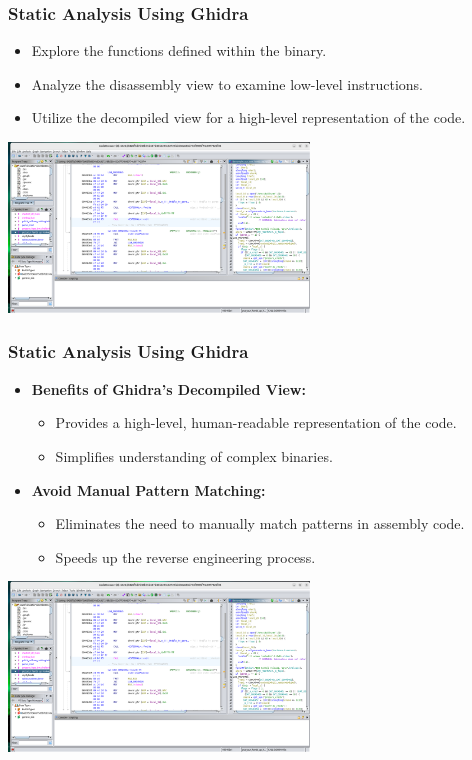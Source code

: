 \begin{frame}
\frametitle{Static Analysis Using Ghidra}

\begin{itemize}
    \item Explore the functions defined within the binary.
    \item Analyze the disassembly view to examine low-level instructions.
    \item Utilize the decompiled view for a high-level representation of the code.
\end{itemize}

\centering
\includegraphics[width=0.6\textwidth]{img/g2.png}
\end{frame}

\begin{frame}
\frametitle{Static Analysis Using Ghidra}

\begin{itemize}
    \item \textbf{Benefits of Ghidra's Decompiled View:}
    \begin{itemize}
        \item Provides a high-level, human-readable representation of the code.
        \item Simplifies understanding of complex binaries.
    \end{itemize}
    \item \textbf{Avoid Manual Pattern Matching:}
    \begin{itemize}
        \item Eliminates the need to manually match patterns in assembly code.
        \item Speeds up the reverse engineering process.
    \end{itemize}
\end{itemize}

\centering
\includegraphics[width=0.6\textwidth]{img/g2.png}
\end{frame}

